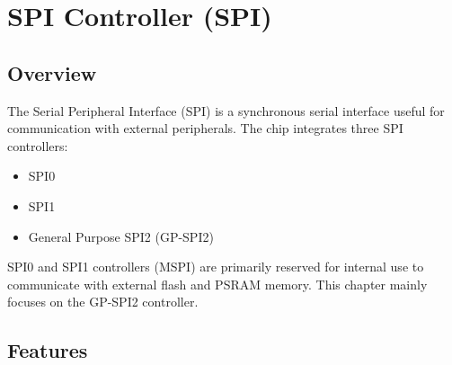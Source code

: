 \documentclass[main\_\_EN.tex]{subfiles}
\begin{document}

\ifglobal
\else
    \listoftodos
    {\let\clearpage\relax \listofdonetodos}
    \tableofcontents
\fi



\hypertarget{spi}{}
\chapter{SPI Controller (SPI)}
\label{mod:spi}

\section{Overview}

The Serial Peripheral Interface (SPI) is a synchronous serial interface useful for communication with external peripherals.
The \chipname{} chip integrates three SPI controllers:
\begin{itemize}
  \item SPI0
  \item SPI1
  \item General Purpose SPI2 (GP-SPI2)
\end{itemize}

SPI0 and SPI1 controllers (MSPI) are primarily reserved for internal use to communicate with external flash and PSRAM memory. This chapter mainly focuses on the GP-SPI2 controller.



\section{Features}
\end{document}
